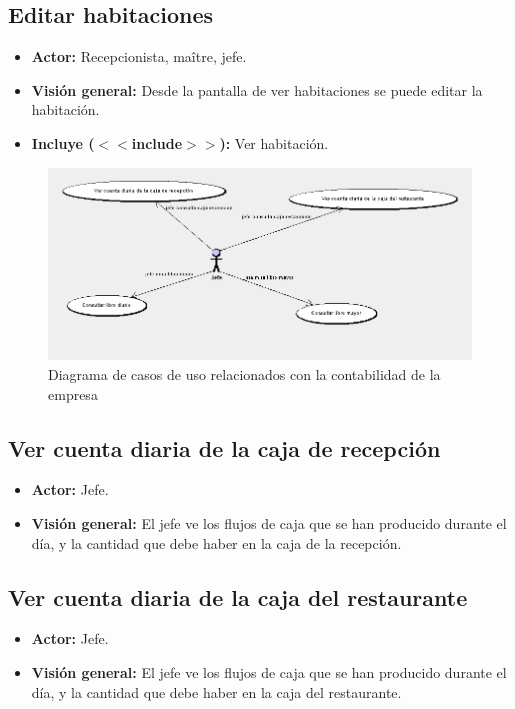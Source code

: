 \documentclass[spanish,a4paper,11pt, twoside]{report}	%
\begin{document}
	\subsection{Editar habitaciones}
		\begin{itemize}
			\item \textbf{Actor:} Recepcionista, maître, jefe.
			\item \textbf{Visión general:} Desde la pantalla de ver habitaciones se puede editar la habitación.	
			\item \textbf{Incluye ($<<$include$>>$):} Ver habitación.
		\end {itemize}

	\begin{figure}[!h]
		\centering
		\includegraphics[scale=0.5]{Contabilidad.png}
		\caption{Diagrama de casos de uso relacionados con la contabilidad de la empresa}
	\end{figure}

	
	\subsection{Ver cuenta diaria de la caja de recepción}
		\begin{itemize}
			\item \textbf{Actor:} Jefe.
			\item \textbf{Visión general:} El jefe ve los flujos de caja que se han producido durante el día, 
				y la cantidad que debe haber en la caja de la recepción.	
		\end {itemize}


	\subsection{Ver cuenta diaria de la caja del restaurante}
		\begin{itemize}
			\item \textbf{Actor:} Jefe.
			\item \textbf{Visión general:} El jefe ve los flujos de caja que se han producido durante el día, 
				y la cantidad que debe haber en la caja del restaurante.	
		\end {itemize}
\end{document}

